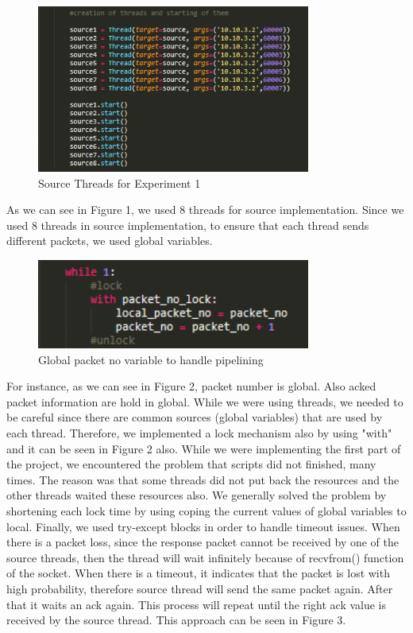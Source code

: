 \documentclass[conference]{IEEEtran}
\begin{document}
\begin{figure}[htp]
    \centering
    \includegraphics[width=9cm]{pipelining2.png}
    \caption{Source Threads for Experiment 1}
    \label{fig:graph}
\end{figure}

As we can see in Figure 1, we used 8 threads for source implementation. Since we used 8 threads in source implementation, to ensure that each thread sends different packets, we used global variables.

\begin{figure}[htp]
    \centering
    \includegraphics[width=9cm]{pipelining1.png}
    \caption{Global packet no variable to handle pipelining}
    \label{fig:graph}
\end{figure}

For instance, as we can see in Figure 2, packet number is global. Also acked packet information are hold in global. While we were using threads, we needed to be careful since there are common sources (global variables) that are used by each thread. Therefore, we implemented a lock mechanism also by using "with" and it can be seen in Figure 2 also. While we were implementing the first part of the project, we encountered the problem that scripts did not finished, many times. The reason was that some threads did not put back the resources and the other threads waited these resources also. We generally solved the problem by shortening each lock time by using coping the current values of global variables to local. Finally, we used try-except blocks in order to handle timeout issues. When there is a packet loss, since the response packet cannot be received by one of the source threads, then the thread will wait infinitely because of recvfrom() function of the socket. When there is a timeout, it indicates that the packet is lost with high probability, therefore source thread will send the same packet again. After that it waits an ack again. This process will repeat until the right ack value is received by the source thread. This approach can be seen in Figure 3. \\
\end{document}
